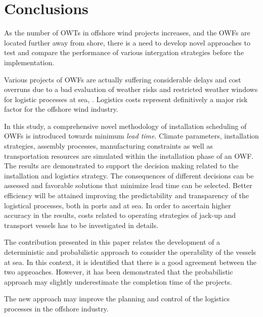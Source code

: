 \section{Conclusions}
\label{conclusions}
As the number of OWTs in offshore wind projects increases, and the OWFs are located further away from shore, there is a need to develop novel approaches to test and compare the performance of various intergation strategies before the implementation. %

Various projects of OWFs are actually suffering considerable delays and cost overruns due to a bad evaluation of weather risks and restricted weather windows for logistic processes at sea, \cite{TCE12, ISOPE2013}. Logistics costs represent definitively a major risk factor for the offshore wind industry.

In this study, a comprehensive novel methodology of installation scheduling of OWFs is introduced towards minimum \textit{lead time}. Climate parameters, installation strategies, assembly processes, manufacturing constraints as well as transportation resources are simulated within the installation phase of an OWF. The results are demonstrated to support the decision making related to the installation and logistics strategy. The consequences of different decisions can be assessed and favorable solutions that minimize lead time can be selected. Better efficiency will be attained improving the predictability and transparency of the logistical processes, both in ports and at sea. In order to ascertain higher accuracy in the results, costs related to operating strategies of jack-up and transport vessels has to be investigated in details.

The contribution presented in this paper relates the development of a deterministic and probabilistic approach to consider the operability of the vessels at sea. In this context, it is identified that there is a good agreement between the two approaches. However, it has been demonstrated that the probabilistic approach may slightly underestimate the completion time of the projects. 

The new approach may improve the planning and control of the logistics processes in the offshore industry.



